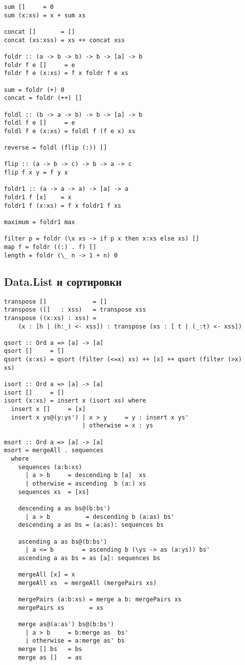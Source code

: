 \documentclass[a4paper,10pt]{article}
\begin{document}
\begin{lstlisting}
sum []     = 0
sum (x:xs) = x + sum xs

concat []       = []
concat (xs:xss) = xs ++ concat xss

foldr :: (a -> b -> b) -> b -> [a] -> b
foldr f e []     = e
foldr f e (x:xs) = f x foldr f e xs

sum = foldr (+) 0
concat = foldr (++) []

foldl :: (b -> a -> b) -> b -> [a] -> b
foldl f e []     = e
foldl f e (x:xs) = foldl f (f e x) xs

reverse = foldl (flip (:)) []

flip :: (a -> b -> c) -> b -> a -> c
flip f x y = f y x

foldr1 :: (a -> a -> a) -> [a] -> a
foldr1 f [x]    = x
foldr1 f (x:xs) = f x foldr1 f xs

maximum = foldr1 max

filter p = foldr (\x xs -> if p x then x:xs else xs) []
map f = foldr ((:) . f) []
length = foldr (\_ n -> 1 + n) 0

\end{lstlisting}

\subsection{Data.List и сортировки}
\begin{lstlisting}
transpose []             = []
transpose ([]   : xss)   = transpose xss
transpose ((x:xs) : xss) =
    (x : [h | (h:_) <- xss]) : transpose (xs : [ t | (_:t) <- xss])

qsort :: Ord a => [a] -> [a]
qsort []     = []
qsort (x:xs) = qsort (filter (<=x) xs) ++ [x] ++ qsort (filter (>x) xs)

isort :: Ord a => [a] -> [a]
isort []     = []
isort (x:xs) = insert x (isort xs) where
  insert x []     = [x]
  insert x ys@(y:ys') | x > y     = y : insert x ys'
                      | otherwise = x : ys

msort :: Ord a => [a] -> [a]
msort = mergeAll . sequences
  where
    sequences (a:b:xs)
      | a > b     = descending b [a]  xs
      | otherwise = ascending  b (a:) xs
    sequences xs  = [xs]

    descending a as bs@(b:bs')
      | a > b          = descending b (a:as) bs'
    descending a as bs = (a:as): sequences bs

    ascending a as bs@(b:bs')
      | a <= b        = ascending b (\ys -> as (a:ys)) bs'
    ascending a as bs = as [a]: sequences bs

    mergeAll [x] = x
    mergeAll xs  = mergeAll (mergePairs xs)

    mergePairs (a:b:xs) = merge a b: mergePairs xs
    mergePairs xs       = xs

    merge as@(a:as') bs@(b:bs')
      | a > b     = b:merge as  bs'
      | otherwise = a:merge as' bs
    merge [] bs   = bs
    merge as []   = as
\end{lstlisting}
\end{document}
